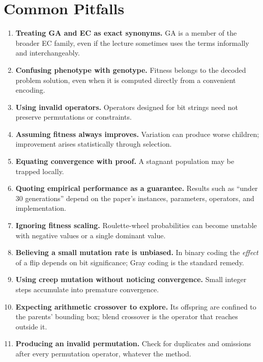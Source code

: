 \documentclass[11pt,a4paper]{article}
\begin{document}
\section{Common Pitfalls}

\begin{enumerate}[leftmargin=*]
  \item \textbf{Treating GA and EC as exact synonyms.}  GA is a member of the
        broader EC family, even if the lecture sometimes uses the terms
        informally and interchangeably.
  \item \textbf{Confusing phenotype with genotype.}  Fitness belongs to the
        decoded problem solution, even when it is computed directly from a
        convenient encoding.
  \item \textbf{Using invalid operators.}  Operators designed for bit strings
        need not preserve permutations or constraints.
  \item \textbf{Assuming fitness always improves.}  Variation can produce
        worse children; improvement arises statistically through selection.
  \item \textbf{Equating convergence with proof.}  A stagnant population may
        be trapped locally.
  \item \textbf{Quoting empirical performance as a guarantee.}  Results such
        as ``under 30 generations'' depend on the paper's instances,
        parameters, operators, and implementation.
  \item \textbf{Ignoring fitness scaling.}  Roulette-wheel probabilities can
        become unstable with negative values or a single dominant value.
  \item \textbf{Believing a small mutation rate is unbiased.}  In binary
        coding the \emph{effect} of a flip depends on bit significance; Gray
        coding is the standard remedy.
  \item \textbf{Using creep mutation without noticing convergence.}  Small
        integer steps accumulate into premature convergence.
  \item \textbf{Expecting arithmetic crossover to explore.}  Its offspring are
        confined to the parents' bounding box; blend crossover is the
        operator that reaches outside it.
  \item \textbf{Producing an invalid permutation.}  Check for duplicates and
        omissions after every permutation operator, whatever the method.
\end{enumerate}
\end{document}
